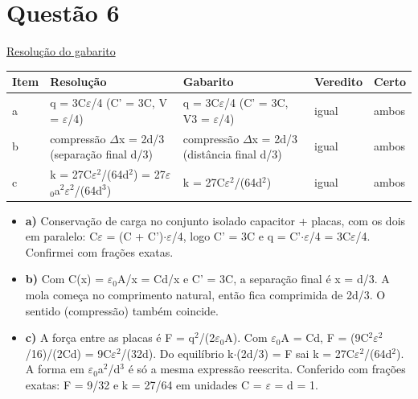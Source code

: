 \documentclass{article}%
\begin{document}
\section*{Questão 6}%
\href{https://poliedroresolve.sistemapoliedro.com.br/vestibulares/ita/2027/ita-2-fase-dia-3-22-10-2026-2-fase-dia-3/dissertativa-6-fisica-2-fase-dia-3-ita-2027}{Resolução do gabarito}\par\smallskip%
\begin{longtable}{@{}p{} p{} p{} p{} p{}@{}}\toprule Item & Resolução & Gabarito & Veredito & Certo \\ \midrule
a & q = 3C$\varepsilon$/4 (C' = 3C, V = $\varepsilon$/4) & q = 3C$\varepsilon$/4 (C' = 3C, V3 = $\varepsilon$/4) & igual & ambos \\
b & compressão $\Delta$x = 2d/3 (separação final d/3) & compressão $\Delta$x = 2d/3 (distância final d/3) & igual & ambos \\
c & k = 27C$\varepsilon$$^2$/(64d$^2$) = 27$\varepsilon$$_{0}$a$^2$$\varepsilon$$^2$/(64d$^3$) & k = 27C$\varepsilon$$^2$/(64d$^2$) & igual & ambos \\
\bottomrule\end{longtable}%
\begin{itemize}%
\item%
\textbf{a)} Conservação de carga no conjunto isolado capacitor + placas, com os dois em paralelo: C$\varepsilon$ = (C + C')$\cdot$$\varepsilon$/4, logo C' = 3C e q = C'$\cdot$$\varepsilon$/4 = 3C$\varepsilon$/4. Confirmei com frações exatas.%
\item%
\textbf{b)} Com C(x) = $\varepsilon$$_{0}$A/x = Cd/x e C' = 3C, a separação final é x = d/3. A mola começa no comprimento natural, então fica comprimida de 2d/3. O sentido (compressão) também coincide.%
\item%
\textbf{c)} A força entre as placas é F = q$^2$/(2$\varepsilon$$_{0}$A). Com $\varepsilon$$_{0}$A = Cd, F = (9C$^2$$\varepsilon$$^2$/16)/(2Cd) = 9C$\varepsilon$$^2$/(32d). Do equilíbrio k$\cdot$(2d/3) = F sai k = 27C$\varepsilon$$^2$/(64d$^2$). A forma em $\varepsilon$$_{0}$a$^2$/d$^3$ é só a mesma expressão reescrita. Conferido com frações exatas: F = 9/32 e k = 27/64 em unidades C = $\varepsilon$ = d = 1.%
\end{itemize}%
\end{document}
